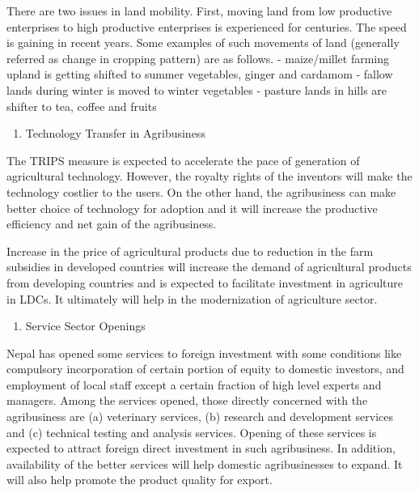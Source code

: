 \documentclass[
  openany]{book}
\providecommand{\tightlist}{%
  \setlength{\itemsep}{0pt}\setlength{\parskip}{0pt}}
\begin{document}
There are two issues in land mobility. First, moving land from low productive enterprises to high productive enterprises is experienced for centuries. The speed is gaining in recent years. Some examples of such movements of land (generally referred as change in cropping pattern) are as follows.
- maize/millet farming upland is getting shifted to summer vegetables, ginger and cardamom
- fallow lands during winter is moved to winter vegetables
- pasture lands in hills are shifter to tea, coffee and fruits

\begin{enumerate}
\def\labelenumi{\arabic{enumi}.}
\setcounter{enumi}{5}
\tightlist
\item
  Technology Transfer in Agribusiness
\end{enumerate}

The TRIPS measure is expected to accelerate the pace of generation of agricultural technology. However, the royalty rights of the inventors will make the technology costlier to the users. On the other hand, the agribusiness can make better choice of technology for adoption and it will increase the productive efficiency and net gain of the agribusiness.

Increase in the price of agricultural products due to reduction in the farm subsidies in developed countries will increase the demand of agricultural products from developing countries and is expected to facilitate investment in agriculture in LDCs. It ultimately will help in the modernization of agriculture sector.

\begin{enumerate}
\def\labelenumi{\arabic{enumi}.}
\setcounter{enumi}{6}
\tightlist
\item
  Service Sector Openings
\end{enumerate}

Nepal has opened some services to foreign investment with some conditions like compulsory incorporation of certain portion of equity to domestic investors, and employment of local staff except a certain fraction of high level experts and managers. Among the services opened, those directly concerned with the agribusiness are (a) veterinary services, (b) research and development services and (c) technical testing and analysis services. Opening of these services is expected to attract foreign direct investment in such agribusiness. In addition, availability of the better services will help domestic agribusinesses to expand. It will also help promote the product quality for export.
\end{document}
